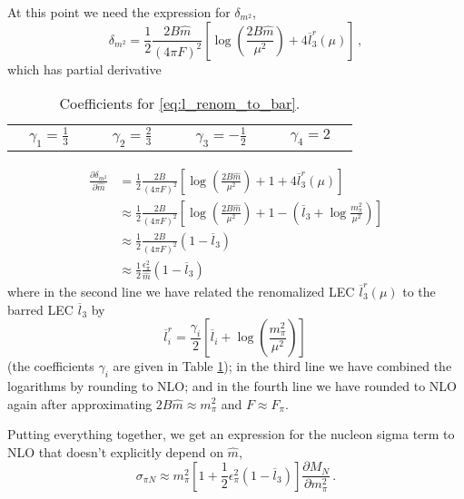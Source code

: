 \documentclass[12pt,tightenlines, raggedbottom, prd, notitlepage]{revtex4-1}
\begin{document}
At this point we need the expression for $\delta_{m^2}$,
\begin{equation}
\delta_{m^2} = \frac{1}{2} \frac{2 B \hat m}{(4 \pi F)^2} \left[ \log \left(\frac{2B\hat m}{\mu^2} \right) + 4 \overline l_3^r (\mu) \right] \, , 
\end{equation}
which has partial derivative 
\begin{table}[]
    \begin{tabular}{cccc} 
    $\quad \gamma_1 = \frac 13 \quad$ & $\quad \gamma_2 = \frac 23 \quad$ & $\quad \gamma_3 = -\frac 12 \quad$ & $\quad \gamma_4 = 2 \quad$
    \end{tabular}
    \caption{Coefficients for \eqref{eq:l_renom_to_bar}.}
    \label{tab:l_renom_to_bar}
\end{table}
\begin{align}
\frac{\partial \delta_{m^2}}{\partial \hat m} &= \frac{1}{2} \frac{2 B }{(4 \pi F)^2} \left[ \log \left(\frac{2B\hat m}{\mu^2} \right) + 1 + 4 \overline l_3^r (\mu) \right] 
\nonumber \\ 
&\approx \frac{1}{2} \frac{2 B }{(4 \pi F)^2} \left[ \log \left(\frac{2B\hat m}{\mu^2} \right) + 1  - \left( \overline l_3  + \log \frac{m_\pi^2}{\mu^2} \right) \right]
\nonumber \\
&\approx \frac{1}{2} \frac{2 B }{(4 \pi F)^2} \left( 1 - \overline l_3 \right)
\nonumber \\
&\approx \frac{1}{2} \frac{\epsilon_\pi^2}{\hat m} \left( 1 - \overline l_3 \right) 
\end{align}
where in the second line we have related the renomalized LEC $\overline l_3^r(\mu)$ to the barred LEC $\overline l_3$ by 
\begin{equation} \label{eq:l_renom_to_bar}
\overline l_i^r = \frac{\gamma_i}{2} \left[ \overline l_i + \log \left( \frac{m_\pi^2}{\mu^2}\right) \right]\, 
\end{equation}
(the coefficients $\gamma_i$ are given in Table \ref{tab:l_renom_to_bar}); in the third line we have combined the logarithms by rounding to NLO; and in the fourth line we have rounded to NLO again after approximating $2 B \hat m \approx m_\pi^2$ and $F \approx F_\pi$. 

Putting everything together, we get an expression for the nucleon sigma term to NLO that doesn't explicitly depend on $\hat m$,
\begin{equation}
\sigma_{\pi N} 
\approx m_\pi^2 \left[ 1 + \frac 12 \epsilon_\pi^2 \left(1 - \overline l_3 \right) \right] \frac{\partial M_N}{\partial m_\pi^2} \, .
\end{equation}
\end{document}
